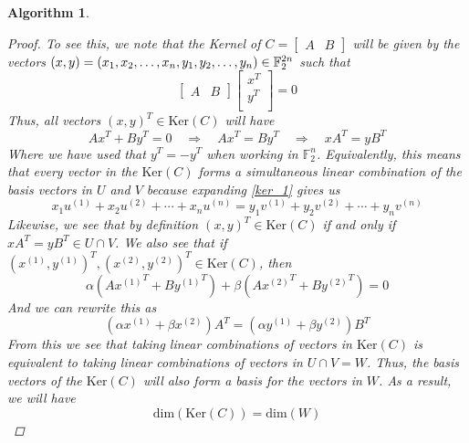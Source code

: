 \documentclass[11pt]{article}
\newtheorem{algorithm}{Algorithm}
\theoremstyle{definition}
\theoremstyle{plain}
\begin{document}
\begin{algorithm}
\begin{proof}
  To see this, we note that the Kernel of $C = \begin{bmatrix} A & B \end{bmatrix}$ will be given by the vectors $(x, y) = \\(x_1, x_2, \ldots, x_n, y_1, y_2, \ldots, y_n) \in \mathbb{F}_2^{2n}$ such that
\begin{equation}
  \begin{bmatrix}
    A & B 
  \end{bmatrix}
  \begin{bmatrix}
    x^T \\ 
    y^T \\ 
  \end{bmatrix}
  = 0 
\end{equation}
Thus, all vectors ${(x, y)}^T \in \text{Ker}(C)$ will have 
\begin{equation}\label{ker_1}
  Ax^T + By^T = 0 \quad \Rightarrow \quad Ax^T = By^T
  \quad \Rightarrow \quad xA^T = yB^T
\end{equation}
Where we have used that $y^T = -y^T$ when working in $\mathbb{F}_2^n$. Equivalently, this means that every vector in the $\text{Ker}(C)$ forms a simultaneous linear combination of the basis vectors in $U$ and $V$ because expanding {\ref{ker_1}} gives us
\begin{equation}
  x_1 u^{(1)} + x_2 u^{(2)} + \cdots + x_n u^{(n)} =
  y_1 v^{(1)} + y_2 v^{(2)} + \cdots + y_n v^{(n)} 
\end{equation}
Likewise, we see that by definition ${(x, y)}^T \in \text{Ker}(C)$ if and only if $xA^T = yB^T \in U \cap V$. We also see that if ${(x^{(1)}, y^{(1)})}^T, {(x^{(2)}, y^{(2)})}^T \in \text{Ker}(C)$, then 
\begin{equation}
\alpha (A {x^{(1)}}^T + B {y^{(1)}}^T) + \beta (A {x^{(2)}}^T + B {y^{(2)}}^T) = 0
\end{equation}
And we can rewrite this as
\begin{equation}
(\alpha {x^{(1)}} + \beta {x^{(2)}})A^T =(\alpha {y^{(1)}} + \beta {y^{(2)}})B^T
\end{equation}
From this we see that taking linear combinations of vectors in $\text{Ker}(C)$ is equivalent to taking linear combinations of vectors in $U \cap V = W$. Thus, the basis vectors of the $\text{Ker}(C)$ will also form a basis for the vectors in $W$. As a result, we will have
\begin{equation}\label{algo_proof_1}
  \text{dim}(\text{Ker}(C)) = \text{dim}(W)
\end{equation}

\end{proof}
\end{algorithm}
\end{document}
